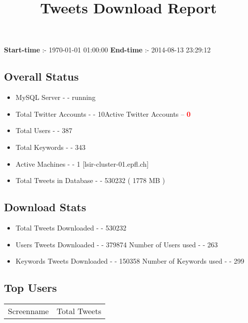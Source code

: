\documentclass{article}\usepackage[T1]{fontenc}
\begin{document}
\title{\textbf{Tweets Download Report}}
               \date{}
                \maketitle
               \centerline{\textbf{Start-time} :- 1970-01-01 01:00:00 \hspace{40pt} \textbf{End-time} :- 2014-08-13 23:29:12}               \subsection*{Overall Status}                \begin{itemize}                \item MySQL Server - - running               \item Total Twitter Accounts - - 10\newline Active Twitter Accounts -- \textcolor{red}{\textbf{0}}               \item Total Users - - 387               \item Total Keywords - - 343               \item Active Machines - - 1 [lsir-cluster-01.epfl.ch]               \item Total Tweets in Database - - 530232 ( 1778 MB )               \end{itemize}               \subsection*{Download Stats}                \begin{itemize}                \item Total Tweets Downloaded - - 530232               \item Users Tweets Downloaded - - 379874 \newline Number of Users used - - 263               \item Keywords Tweets Downloaded - - 150358 \newline Number of Keywords used - - 299              \end{itemize}              \subsection*{Top Users}\begin{center}         \begin{tabular}{|c|c|}         \hline         Screenname & Total Tweets \\ 

\end{tabular}
\end{center}
\end{document}
